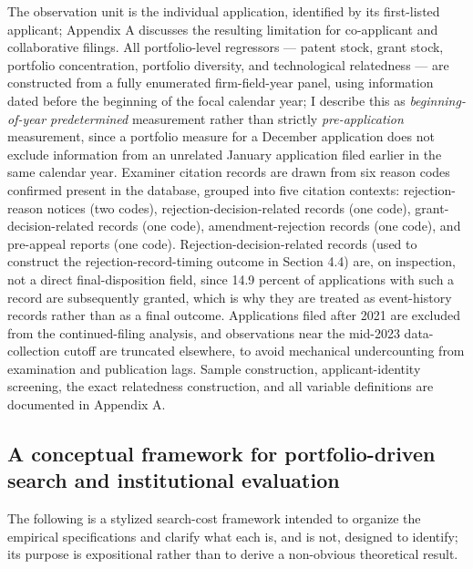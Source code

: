 \documentclass[12pt]{article}
\begin{document}
The observation unit is the individual application, identified by its first-listed applicant; Appendix A discusses the resulting limitation for co-applicant and collaborative filings. All portfolio-level regressors --- patent stock, grant stock, portfolio concentration, portfolio diversity, and technological relatedness --- are constructed from a fully enumerated firm-field-year panel, using information dated before the beginning of the focal calendar year; I describe this as \emph{beginning-of-year predetermined} measurement rather than strictly \emph{pre-application} measurement, since a portfolio measure for a December application does not exclude information from an unrelated January application filed earlier in the same calendar year. Examiner citation records are drawn from six reason codes confirmed present in the database, grouped into five citation contexts: rejection-reason notices (two codes), rejection-decision-related records (one code), grant-decision-related records (one code), amendment-rejection records (one code), and pre-appeal reports (one code). Rejection-decision-related records (used to construct the rejection-record-timing outcome in Section 4.4) are, on inspection, not a direct final-disposition field, since 14.9 percent of applications with such a record are subsequently granted, which is why they are treated as event-history records rather than as a final outcome. Applications filed after 2021 are excluded from the continued-filing analysis, and observations near the mid-2023 data-collection cutoff are truncated elsewhere, to avoid mechanical undercounting from examination and publication lags. Sample construction, applicant-identity screening, the exact relatedness construction, and all variable definitions are documented in Appendix A.

\subsection{A conceptual framework for portfolio-driven search and institutional evaluation}

The following is a stylized search-cost framework intended to organize the empirical specifications and clarify what each is, and is not, designed to identify; its purpose is expositional rather than to derive a non-obvious theoretical result.
\end{document}
